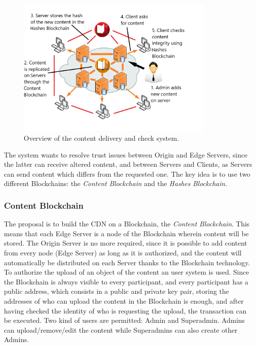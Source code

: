 \documentclass[hidelinks,conference,compsoc]{IEEEtran}
\begin{document}
\begin{figure}[!h]
	\centering
	\includegraphics[width=3.8in]{images/SystemOverview.png}
	
	\caption{Overview of the content delivery and check system.}
	\label{fig:SystemOverview}
\end{figure} 

The system wants to resolve trust issues between Origin and Edge Servers, since the latter can receive altered content, and between Servers and Clients, as Servers can send content which differs from the requested one. The key idea is to use two different Blockchains: the \textit{Content Blockchain} and the \textit{Hashes Blockchain}.
\subsubsection{Content Blockchain}
The proposal is to build the CDN on a Blockchain, the \textit{Content Blockchain}. This means that each Edge Server is a node of the Blockchain wherein content will be stored. The Origin Server is no more required, since it is possible to add content from every node (Edge Server) as long as it is authorized, and the content will automatically be distributed on each Server thanks to the Blockchain technology. To authorize the upload of an object of the content an user system is used. Since the Blockchain is always visible to every participant, and every participant has a public address, which consists in a public and private key pair, storing the addresses of who can upload the content in the Blockchain is enough, and after having checked the identity of who is requesting the upload, the transaction can be executed. Two kind of users are permitted: Admin and Superadmin. Admins can upload/remove/edit the content while Superadmins can also create other Admins. 
\end{document}
